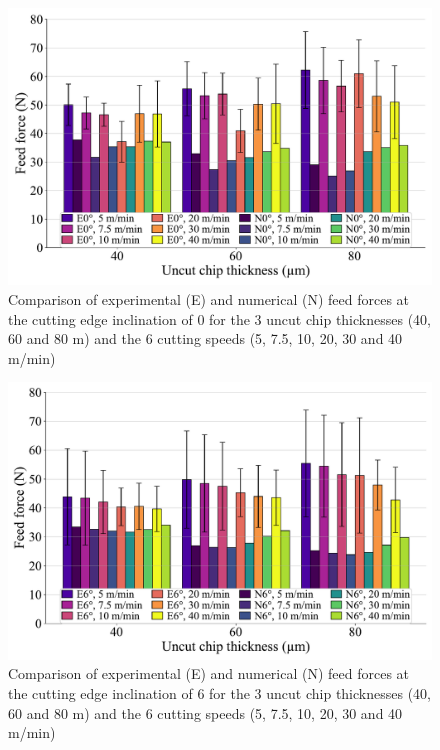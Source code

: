 \documentclass[preprint,12pt,times]{elsarticle}
\begin{document}
\begin{figure}[!h]
\centering
\includegraphics[width = 140 mm]{Figures/Fy_0}
\caption{Comparison of experimental (E) and numerical (N) feed forces at the cutting edge inclination of 0\textdegree{} for the 3 uncut chip thicknesses (40, 60 and 80 \textmu{}m) and the 6 cutting speeds (5, 7.5, 10, 20, 30 and 40 m/min)}
\label{Fy_0}
\end{figure}

\begin{figure}[!h]
\centering
\includegraphics[width = 140 mm]{Figures/Fy_6}
\caption{Comparison of experimental (E) and numerical (N) feed forces at the cutting edge inclination of 6\textdegree{} for the 3 uncut chip thicknesses (40, 60 and 80 \textmu{}m) and the 6 cutting speeds (5, 7.5, 10, 20, 30 and 40 m/min)}
\label{Fy_6}
\end{figure}
\end{document}
